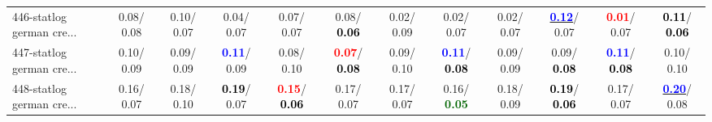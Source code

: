 \begin{table}[h]
\begin{center}
{\begin{tabular}{lc|c|c|c|c|c|c|c|c|c|c}
446-statlog german cre... &   0.08/  0.08 &   0.10/  0.07 &   0.04/  0.07 &   0.07/  0.07 &   0.08/\textcolor{black}{\textbf{  0.06}} &   0.02/  0.09 &   0.02/  0.07 &   0.02/  0.07 & \underline{\textcolor{blue}{\textbf{  0.12}}}/  0.07 & \textcolor{red}{\textbf{  0.01}}/  0.07 & \textcolor{black}{\textbf{  0.11}}/\textcolor{black}{\textbf{  0.06}} \\
447-statlog german cre... &   0.10/  0.09 &   0.09/  0.09 & \textcolor{blue}{\textbf{  0.11}}/  0.09 &   0.08/  0.10 & \textcolor{red}{\textbf{  0.07}}/\textcolor{black}{\textbf{  0.08}} &   0.09/  0.10 & \textcolor{blue}{\textbf{  0.11}}/\textcolor{black}{\textbf{  0.08}} &   0.09/  0.09 &   0.09/\textcolor{black}{\textbf{  0.08}} & \textcolor{blue}{\textbf{  0.11}}/\textcolor{black}{\textbf{  0.08}} &   0.10/  0.10 \\
448-statlog german cre... &   0.16/  0.07 &   0.18/  0.10 & \textcolor{black}{\textbf{  0.19}}/  0.07 & \textcolor{red}{\textbf{  0.15}}/\textcolor{black}{\textbf{  0.06}} &   0.17/  0.07 &   0.17/  0.07 &   0.16/\textcolor{darkgreen}{\textbf{  0.05}} &   0.18/  0.09 & \textcolor{black}{\textbf{  0.19}}/\textcolor{black}{\textbf{  0.06}} &   0.17/  0.07 & \underline{\textcolor{blue}{\textbf{  0.20}}}/  0.08 \\\end{tabular}}\label{stratsALCKappa13AllReduxHalfa}
\end{center}
\end{table}
